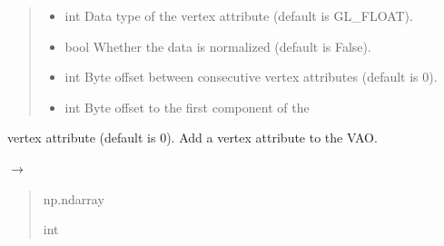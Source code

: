 \documentclass[a4paper,10pt,english,openany,oneside]{sphinxmanual}
\begin{document}
\begin{fulllineitems}
\begin{fulllineitems}
\begin{quote}
\begin{description}
\begin{itemize}
\item {} 
\sphinxAtStartPar
{} \textendash{} int Data type of the vertex attribute (default is GL\_FLOAT).

\item {} 
\sphinxAtStartPar
{} \textendash{} bool Whether the data is normalized (default is False).

\item {} 
\sphinxAtStartPar
{} \textendash{} int Byte offset between consecutive vertex attributes (default is 0).

\item {} 
\sphinxAtStartPar
{} \textendash{} int Byte offset to the first component of the

\end{itemize}

\end{description}\end{quote}

\sphinxAtStartPar
vertex attribute (default is 0).
Add a vertex attribute to the VAO.

\end{fulllineitems}


\begin{fulllineitems}
\label{\detokenize{api/buffers:picogl.backend.modern.core.vertex.array.object.VertexArrayObject.add_ebo}}
\pysigstartsignatures
\pysiglinewithargsret
{}
{}
{{ $\rightarrow$ {\hyperref[\detokenize{api/buffers:picogl.backend.modern.core.vertex.buffer.element.ModernEBO}]{}}}}
\pysigstopsignatures\begin{quote}\begin{description}
\sphinxAtStartPar
{} \textendash{} np.ndarray

\sphinxAtStartPar
int


\end{description}
\end{quote}
\end{fulllineitems}
\end{fulllineitems}
\end{document}
